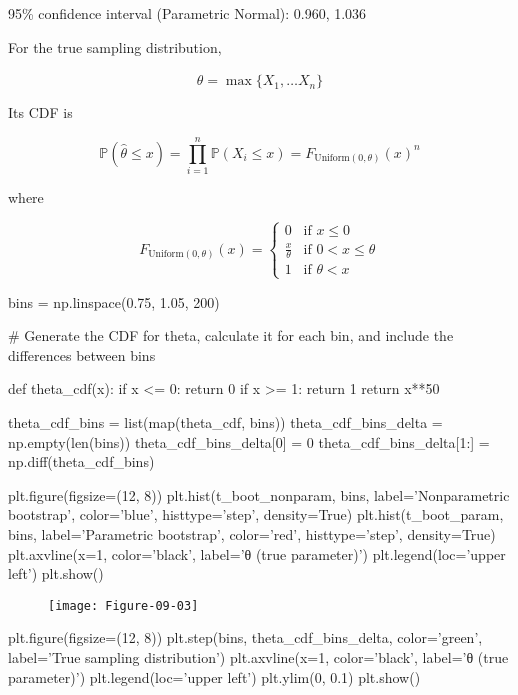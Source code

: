 \begin{console}
95\% confidence interval (Parametric Normal):     0.960, 1.036
\end{console}

For the true sampling distribution,

\[\hat{\theta} = \max \{ X_{1}, \dots X_{n} \}\]

Its CDF is

\[\mathbb{P}(\hat{\theta} \leq x) = \prod_{i=1}^{n} \mathbb{P}(X_{i} \leq x) = F_{\text{Uniform}(0, \theta)}(x)^{n}\]

where

\[F_{\text{Uniform}(0, \theta)}(x) = \begin{cases}
0 & \text{if } x \leq 0 \\
\frac{x}{\theta} & \text{if } 0 < x \leq \theta \\
1 & \text{if } \theta < x
\end{cases}
\]

\begin{python}
bins = np.linspace(0.75, 1.05, 200)
\end{python}

\begin{python}
# Generate the CDF for theta, calculate it for each bin, and include the differences between bins

def theta_cdf(x):
    if x <= 0:
        return 0
    if x >= 1:
        return 1
    return x**50

theta_cdf_bins = list(map(theta_cdf, bins))
theta_cdf_bins_delta = np.empty(len(bins))
theta_cdf_bins_delta[0] = 0
theta_cdf_bins_delta[1:] = np.diff(theta_cdf_bins)
\end{python}

\begin{python}
plt.figure(figsize=(12, 8))
plt.hist(t_boot_{n}onparam, bins, label='Nonparametric bootstrap', color='blue', 
         histtype='step', density=True)
plt.hist(t_boot_param, bins, label='Parametric bootstrap', color='red', 
         histtype='step', density=True)
plt.axvline(x=1, color='black', label='θ (true parameter)')
plt.legend(loc='upper left')
plt.show()
\end{python}

\begin{figure}[H]
\centering
\texttt{[image: Figure-09-03]}
\end{figure}

\begin{python}
plt.figure(figsize=(12, 8))
plt.step(bins, theta_cdf_bins_delta, color='green', label='True sampling distribution')
plt.axvline(x=1, color='black', label='θ (true parameter)')
plt.legend(loc='upper left')
plt.ylim(0, 0.1)
plt.show()
\end{python}

